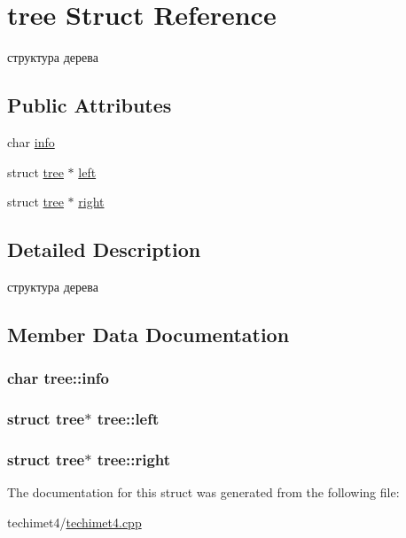 \hypertarget{structtree}{\section{tree Struct Reference}
\label{structtree}
}


структура дерева  


\subsection*{Public Attributes}
\begin{DoxyCompactItemize}
\item 
char \hyperlink{structtree_aa2364e293fd7f793367711b97100556c}{info}
\item 
struct \hyperlink{structtree}{tree} $\ast$ \hyperlink{structtree_a719b6f34a3ac12d46c29f9b7d6308438}{left}
\item 
struct \hyperlink{structtree}{tree} $\ast$ \hyperlink{structtree_a50cf9e7e35dcd0cc2f207389d1ac8852}{right}
\end{DoxyCompactItemize}


\subsection{Detailed Description}
структура дерева 

\subsection{Member Data Documentation}
\hypertarget{structtree_aa2364e293fd7f793367711b97100556c}{
\subsubsection[{info}]{\setlength{\rightskip}{0pt plus 5cm}char tree\-::info}}\label{structtree_aa2364e293fd7f793367711b97100556c}
\hypertarget{structtree_a719b6f34a3ac12d46c29f9b7d6308438}{
\subsubsection[{left}]{\setlength{\rightskip}{0pt plus 5cm}struct {\bf tree}$\ast$ tree\-::left}}\label{structtree_a719b6f34a3ac12d46c29f9b7d6308438}
\hypertarget{structtree_a50cf9e7e35dcd0cc2f207389d1ac8852}{
\subsubsection[{right}]{\setlength{\rightskip}{0pt plus 5cm}struct {\bf tree}$\ast$ tree\-::right}}\label{structtree_a50cf9e7e35dcd0cc2f207389d1ac8852}


The documentation for this struct was generated from the following file\-:\begin{DoxyCompactItemize}
\item 
techimet4/\hyperlink{techimet4_8cpp}{techimet4.\-cpp}\end{DoxyCompactItemize}

